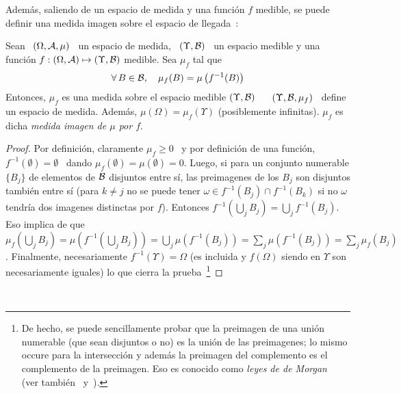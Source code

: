 Adem\'as, saliendo de un espacio de medida y una funci\'on $f$ medible, se puede
definir una medida imagen  sobre el espacio de llegada~\cite{AthLah06, Bog07:v1,
  Coh13}:
%
\begin{teorema}\label{Th:MP:MedidaImagen}
  Sean  \ $(\Omega,\mathcal{A},\mu)$  \  un espacio  de  medida, \  $(\Upsilon,\mathcal{B})$ \  un
  espacio  medible  y  una  funci\'on  $f:  (\Omega,\mathcal{A})  \mapsto  (\Upsilon,\mathcal{B})$
  medible. Sea $\mu_f$ tal que
  \[
  \forall \,  B \in  \mathcal{B}, \quad  \mu_f(B) = \mu\left( f^{-1}(B) \right)
  \]
  Entonces, $\mu_f$ es una medida sobre el espacio medible $(\Upsilon,\mathcal{B})$ \ \ie
  \ $(\Upsilon,\mathcal{B},\mu_f)$ \ define un espacio de medida.  Adem\'as, $\mu(\Omega)
  =  \mu_f(\Upsilon)$ (posiblemente  infinitas).  $\mu_f$ es  dicha {\it  medida
    imagen de $\mu$ por $f$}.
\end{teorema}
%
\begin{proof}
  Por  definici\'on,  claramente $\mu_f  \ge  0$ \  y  por  definici\'on de  una
  funci\'on,  $f^{-1}(\emptyset)  =   \emptyset$  \  dando  $\mu_f(\emptyset)  =
  \mu(\emptyset) =  0$.  Luego,  si para  un conjunto numerable  $\{ B_j  \}$ de
  elementos  de $\mathcal{B}$  disjuntos entre  s\'i, las  preimagenes de  los  $B_j$ son
  disjuntos tambi\'en entre  s\'i (para $k \ne j$ no se  puede tener $\omega \in
  f^{-1}(B_j) \cap f^{-1}(B_k)$ si no $\omega$ tendr\'ia dos imagenes distinctas
  por  $f$).   Entonces  $\displaystyle  f^{-1}\left( \bigcup_j  B_j  \right)  =
  \bigcup_j  f^{-1}(B_j)$.   Eso   implica  de  que  $\displaystyle  \mu_f\left(
    \bigcup_j B_j \right) = \mu\left( f^{-1}\left( \bigcup_j B_j \right) \right)
  =  \bigcup_j  \mu\left( f^{-1}(B_j)  \right)  =  \sum_j \mu\left(  f^{-1}(B_j)
  \right) = \sum_j  \mu_f(B_j)$.  Finalmente, necesariamente $f^{-1}(\Upsilon) =
  \Omega$  (es incluida y  $f(\Omega)$ siendo  en $\Upsilon$  son necesariamente
  iguales) lo  que cierra la  prueba~\footnote{De hecho, se  puede sencillamente
    probar que la  preimagen de una uni\'on numerable (que  sean disjuntos o no)
    es la uni\'on  de las preimagenes; lo mismo occure  para la intersecci\'on y
    adem\'as la  preimagen del  complemento es el  complemento de  la preimagen.
    Eso  es  conocido  como  {\it  leyes de  de  Morgan}~\cite{AthLah06,  Coh13,
      HogMck13}              (ver              tambi\'en~\cite[Cap.~1]{KolFom57}
    y~\cite[Caps.~5~\&~6]{KolFom61}).}
\end{proof}

\

